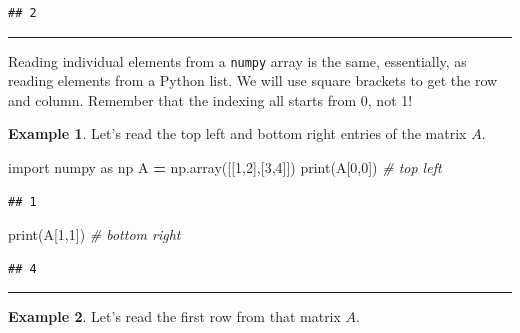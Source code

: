 \documentclass[
]{book}
\newenvironment{Shaded}{\begin{snugshade}}{\end{snugshade}}
\newcommand{\BuiltInTok}[1]{#1}
\newcommand{\CommentTok}[1]{\textcolor[rgb]{0.56,0.35,0.01}{\textit{#1}}}
\newcommand{\DecValTok}[1]{\textcolor[rgb]{0.00,0.00,0.81}{#1}}
\newcommand{\ImportTok}[1]{#1}
\newcommand{\NormalTok}[1]{#1}
\newcommand{\OperatorTok}[1]{\textcolor[rgb]{0.81,0.36,0.00}{\textbf{#1}}}
\theoremstyle{definition}
\theoremstyle{definition}
\newtheorem{example}{Example}[chapter]
\theoremstyle{definition}
\theoremstyle{remark}
\begin{document}
\begin{verbatim}
## 2
\end{verbatim}

\begin{center}\rule{0.5\linewidth}{0.5pt}\end{center}

Reading individual elements from a \texttt{numpy} array is the same, essentially, as reading elements from a Python list. We will use square brackets to get the row and column. Remember that the indexing all starts from 0, not 1!

\begin{example}
\protect\hypertarget{exm:unnamed-chunk-717}{}{\label{exm:unnamed-chunk-717} }Let's read the top left and bottom right entries of the matrix \(A\).
\end{example}

\begin{Shaded}
\begin{Highlighting}[]
\ImportTok{import}\NormalTok{ numpy }\ImportTok{as}\NormalTok{ np}
\NormalTok{A }\OperatorTok{=}\NormalTok{ np.array([[}\DecValTok{1}\NormalTok{,}\DecValTok{2}\NormalTok{],[}\DecValTok{3}\NormalTok{,}\DecValTok{4}\NormalTok{]])}
\BuiltInTok{print}\NormalTok{(A[}\DecValTok{0}\NormalTok{,}\DecValTok{0}\NormalTok{]) }\CommentTok{\# top left}
\end{Highlighting}
\end{Shaded}

\begin{verbatim}
## 1
\end{verbatim}

\begin{Shaded}
\begin{Highlighting}[]
\BuiltInTok{print}\NormalTok{(A[}\DecValTok{1}\NormalTok{,}\DecValTok{1}\NormalTok{]) }\CommentTok{\# bottom right}
\end{Highlighting}
\end{Shaded}

\begin{verbatim}
## 4
\end{verbatim}

\begin{center}\rule{0.5\linewidth}{0.5pt}\end{center}

\begin{example}
\protect\hypertarget{exm:unnamed-chunk-719}{}{\label{exm:unnamed-chunk-719} }Let's read the first row from that matrix \(A\).
\end{example}
\end{document}
